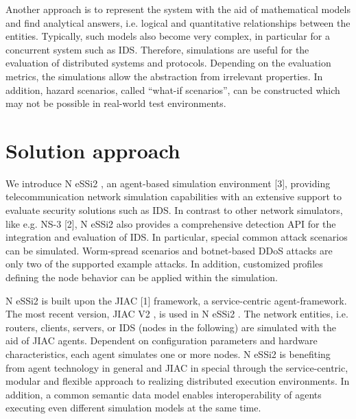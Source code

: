 \documentclass[sigconf]{aamas}
\begin{document}
Another approach is to represent the system with the aid of mathematical models and find analytical answers, i.e. logical and quantitative relationships between the entities.
Typically, such models also become very complex, in particular for a concurrent system such as IDS. Therefore, simulations are useful for the evaluation of distributed systems and protocols. Depending on the evaluation metrics, the simulations allow the abstraction from irrelevant properties.
In addition, hazard scenarios, called “what-if scenarios”, can be constructed which may not be possible in real-world test environments.



\section{Solution approach}

We introduce N eSSi2 , an agent-based simulation environment [3], providing telecommunication network simulation capabilities with an extensive support to evaluate security solutions such as IDS. In contrast to other network simulators, like e.g. NS-3 [2], N eSSi2 also provides a comprehensive detection API for the integration and evaluation of IDS. In particular, special common attack scenarios can be simulated. Worm-spread scenarios and botnet-based DDoS attacks are only two of the supported example attacks. In
addition, customized profiles defining the node behavior can be applied within the simulation.

N eSSi2 is built upon the JIAC [1] framework, a service-centric agent-framework. The most recent version, JIAC V2 , is used in N eSSi2 . The network entities, i.e. routers, clients, servers, or IDS (nodes in the following) are simulated with the aid of JIAC agents. Dependent on configuration parameters and hardware characteristics, each agent simulates one or more nodes. N eSSi2 is benefiting from agent technology in general and JIAC in special through the service-centric, modular and flexible approach to realizing distributed execution environments. In addition, a common semantic data model enables interoperability of agents executing even different simulation models at the same time.
\end{document}
